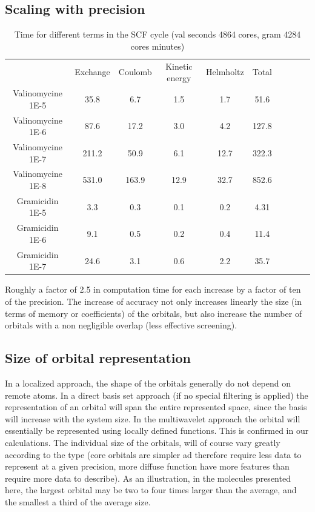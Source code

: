 \documentclass{article}
\begin{document}
\subsection{Scaling with precision}

\begin{table}[t]
    \centering
    \begin{tabular}{cccccccccc}
& Exchange &  Coulomb & Kinetic energy& Helmholtz & Total \\
 Valinomycine 1E-5& 35.8&6.7 & 1.5 & 1.7 & 51.6\\
Valinomycine 1E-6& 87.6 &17.2 & 3.0& 4.2 &127.8\\
Valinomycine 1E-7& 211.2& 50.9& 6.1&12.7& 322.3 \\
Valinomycine 1E-8  & 531.0& 163.9& 12.9&32.7& 852.6 \\
 Gramicidin 1E-5&3.3& 0.3 & 0.1& 0.2&4.31 \\
  Gramicidin 1E-6& 9.1& 0.5& 0.2& 0.4&11.4\\
  Gramicidin 1E-7& 24.6&3.1& 0.6& 2.2&  35.7\\
    \end{tabular}
    \caption{Time for different terms in the SCF cycle (val seconds 4864 cores, gram 4284 cores minutes)}
    \label{tab:times}
\end{table}

Roughly a factor of 2.5 in computation time for each increase by a factor of ten of the precision.
The increase of accuracy not only increases linearly the size (in terms of memory or coefficients) of the orbitals, but also increase the number of orbitals with a non negligible overlap (less effective screening).


\subsection{Size of orbital representation}
\label{sizes}

In a localized approach, the shape of the orbitals generally do not depend on remote atoms. In a direct basis set approach (if no special filtering is applied) the representation of an orbital will span the entire represented space, since the basis will increase with the system size. In the multiwavelet approach the orbital will essentially be represented using locally defined functions.
This is confirmed in our calculations.
The individual size of the orbitals, will of course vary greatly according to the type (core orbitals are simpler ad therefore require less data to represent at a given precision, more diffuse function have more features than require more data to describe). As an illustration, in the molecules presented here, the largest orbital may be two to four times larger than the average, and the smallest a third of the average size.
\end{document}
